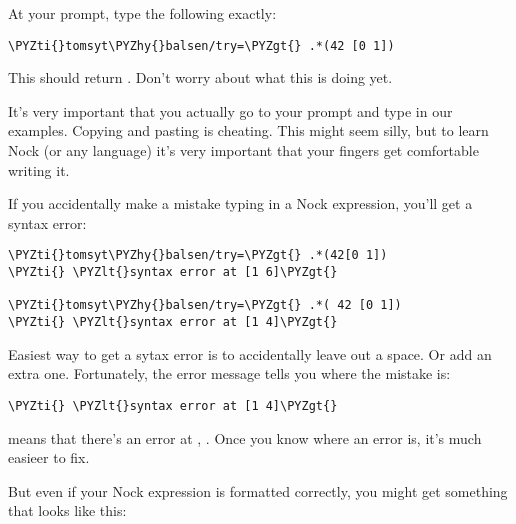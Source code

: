 At your prompt, type the following exactly:
\begin{framed_shaded}
\begin{Verbatim}[fontsize=\relsize{-2.5},fontseries=b,commandchars=\\\{\}]
\PYZti{}tomsyt\PYZhy{}balsen/try=\PYZgt{} .*(42 [0 1])
\end{Verbatim}
\end{framed_shaded}
This should return . Don't worry about what this is doing yet.

It's very important that you actually go to your prompt and type in our
examples. Copying and pasting is cheating. This might seem silly, but to learn
Nock (or any language)  it's very important that your fingers get
comfortable writing it. 

If you accidentally make a mistake typing in a Nock expression, you'll get a
syntax error:

\begin{framed_shaded}
\begin{Verbatim}[fontsize=\relsize{-2.5},fontseries=b,commandchars=\\\{\}]
\PYZti{}tomsyt\PYZhy{}balsen/try=\PYZgt{} .*(42[0 1]) 
\PYZti{} \PYZlt{}syntax error at [1 6]\PYZgt{}

\PYZti{}tomsyt\PYZhy{}balsen/try=\PYZgt{} .*( 42 [0 1]) 
\PYZti{} \PYZlt{}syntax error at [1 4]\PYZgt{}
\end{Verbatim}
\end{framed_shaded}

Easiest way to get a sytax error is to accidentally leave out a space. Or add
an extra one. Fortunately, the error message tells you where the mistake is:

\begin{framed_shaded}
\begin{Verbatim}[fontsize=\relsize{-2.5},fontseries=b,commandchars=\\\{\}]
\PYZti{} \PYZlt{}syntax error at [1 4]\PYZgt{}
\end{Verbatim}
\end{framed_shaded}

means that there's an error at , .  Once you know where an
error is, it's much easieer to fix.

But even if your Nock expression is formatted correctly, you might get
something that looks like this:

